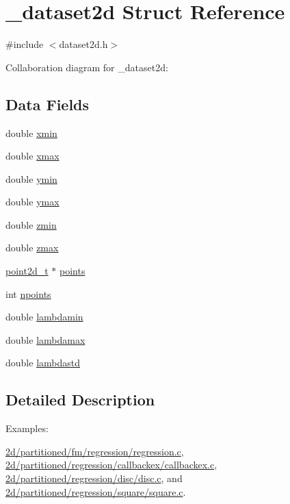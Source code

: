 \hypertarget{struct__dataset2d}{}\section{\+\_\+dataset2d Struct Reference}
\label{struct__dataset2d}


{\ttfamily \#include $<$dataset2d.\+h$>$}



Collaboration diagram for \+\_\+dataset2d\+:
\subsection*{Data Fields}
\begin{DoxyCompactItemize}
\item 
double \hyperlink{struct__dataset2d_afcbe18cdc63b6634a0b6d9c15ab6beb7}{xmin}
\item 
double \hyperlink{struct__dataset2d_aab6f2e4c4061819ec9fa8ef6cf670308}{xmax}
\item 
double \hyperlink{struct__dataset2d_acf2b4bf1e679fdeadf29f1a2257cbf27}{ymin}
\item 
double \hyperlink{struct__dataset2d_a8ed0816f68228f5c1320629022cd28d2}{ymax}
\item 
double \hyperlink{struct__dataset2d_ab0a7953680cd29d50a435f14749f0d81}{zmin}
\item 
double \hyperlink{struct__dataset2d_a7fe5f9291be9830530ddd01fcf8884dd}{zmax}
\item 
\hyperlink{dataset2d_8h_a4ad5b5647046e2b43db49be39bdd5413}{point2d\+\_\+t} $\ast$ \hyperlink{struct__dataset2d_ad1246d82ce3af334ee62bcda7d96d010}{points}
\item 
int \hyperlink{struct__dataset2d_a56b62d44c3ab4ddb0fb65029192f2a5e}{npoints}
\item 
double \hyperlink{struct__dataset2d_ad6ecdb33d6da1a66b09c395e3b96ee3d}{lambdamin}
\item 
double \hyperlink{struct__dataset2d_aeac50b426071c64850da07bc7f084f43}{lambdamax}
\item 
double \hyperlink{struct__dataset2d_a7207b67831f172d5166fdba9808cdf28}{lambdastd}
\end{DoxyCompactItemize}


\subsection{Detailed Description}
\begin{Desc}
\item[Examples\+: ]\par
\hyperlink{2d_2partitioned_2fm_2regression_2regression_8c-example}{2d/partitioned/fm/regression/regression.\+c}, \hyperlink{2d_2partitioned_2regression_2callbackex_2callbackex_8c-example}{2d/partitioned/regression/callbackex/callbackex.\+c}, \hyperlink{2d_2partitioned_2regression_2disc_2disc_8c-example}{2d/partitioned/regression/disc/disc.\+c}, and \hyperlink{2d_2partitioned_2regression_2square_2square_8c-example}{2d/partitioned/regression/square/square.\+c}.\end{Desc}


